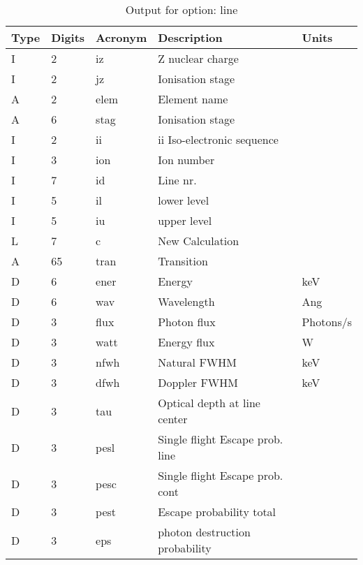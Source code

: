 \begin{table}[!p]
\caption{Output for option: line}
\label{tabout:line}
\begin{tabular}{lllll}
\hline
Type & Digits & Acronym & Description & Units \\ 
\hline
I &  2 & iz   & Z nuclear charge                 &                  \\
I &  2 & jz   & Ionisation stage                 &                  \\
A &  2 & elem & Element name                     &                  \\
A &  6 & stag & Ionisation stage                 &                  \\
I &  2 & ii   & ii Iso-electronic sequence       &                  \\
I &  3 & ion  & Ion number                       &                  \\
I &  7 & id   & Line nr.                         &                  \\
I &  5 & il   & lower level                      &                  \\
I &  5 & iu   & upper level                      &                  \\
L &  7 & c    & New Calculation                  &                  \\
A & 65 & tran & Transition                       &                  \\
D &  6 & ener & Energy                           & keV              \\
D &  6 & wav  & Wavelength                       & Ang              \\
D &  3 & flux & Photon flux                      & Photons/s        \\
D &  3 & watt & Energy flux                      & W                \\
D &  3 & nfwh & Natural FWHM                     & keV              \\
D &  3 & dfwh & Doppler FWHM                     & keV              \\
D &  3 & tau  & Optical depth at line center     &                  \\
D &  3 & pesl & Single flight Escape prob. line  &                  \\
D &  3 & pesc & Single flight Escape prob. cont  &                  \\
D &  3 & pest & Escape probability total         &                  \\
D &  3 & eps  & photon destruction probability   &                  \\
\hline
\end{tabular}
\end{table}

